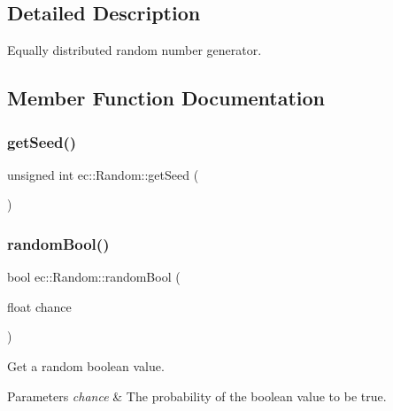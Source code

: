 \subsection{Detailed Description}
Equally distributed random number generator. 

\subsection{Member Function Documentation}
\mbox{\label{classec_1_1_random_a59c8074b3adbaa81ad9e82d3f398b441}} 
\subsubsection{\texorpdfstring{get\+Seed()}{getSeed()}}
{\footnotesize\ttfamily unsigned int ec\+::\+Random\+::get\+Seed (\begin{DoxyParamCaption}{ }\end{DoxyParamCaption})\hspace{0.3cm}{\ttfamily [static]}}

\mbox{\label{classec_1_1_random_ae8d7f55e5847d7c83e72539b5517dc8d}} 
\subsubsection{\texorpdfstring{random\+Bool()}{randomBool()}}
{\footnotesize\ttfamily bool ec\+::\+Random\+::random\+Bool (\begin{DoxyParamCaption}\item[{float}]{chance }\end{DoxyParamCaption})\hspace{0.3cm}{\ttfamily [static]}}

Get a random boolean value. 
\begin{DoxyParams}{Parameters}
{\em chance} & The probability of the boolean value to be true. \\
\hline
\end{DoxyParams}
\mbox{\label{classec_1_1_random_a121adac4b6557b213e059b1e15bad496}} 
